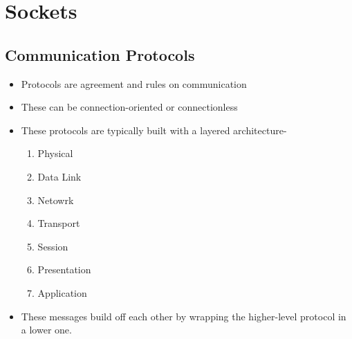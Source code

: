 \section{Sockets}\label{sec:Sockets}
\subsection{Communication Protocols}\label{subsec:Communication_Protocols}
\begin{itemize}
\item Protocols are agreement and rules on communication
\item These can be connection-oriented or connectionless
\item These protocols are typically built with a layered architecture-
\begin{enumerate}
\item Physical
\item Data Link
\item Netowrk
\item Transport
\item Session
\item Presentation
\item Application
\end{enumerate}
\item These messages build off each other by wrapping the higher-level protocol in a lower one.
\end{itemize}


